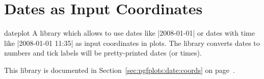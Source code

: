 
\section{Dates as Input Coordinates}

\begin{pgfplotslibrary}{dateplot}
    A library which allows to use dates like |2008-01-01| or dates with time
    like |2008-01-01 11:35| as input coordinates in plots. The library converts
    dates to numbers and tick labels will be pretty-printed dates (or times).

    This library is documented in Section~\ref{sec:pgfplots:date:coords} on
    page~\pageref{sec:pgfplots:date:coords}.
\end{pgfplotslibrary}
